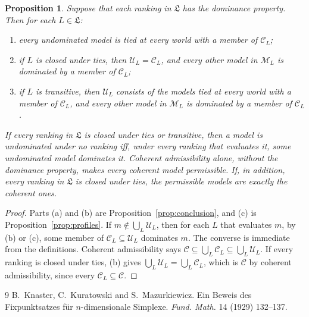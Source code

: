 \documentclass[11pt]{article}
\newtheorem{proposition}[theorem]{Proposition}
\theoremstyle{definition}
\newcommand{\M}{\mathcal M}
\newcommand{\C}{\mathcal C}
\newcommand{\U}{\mathcal U}
\newcommand{\Lf}{\mathfrak L}
\begin{document}
\begin{proposition}\label{prop:permissible}
Suppose that each ranking in $\Lf$ has the dominance property. Then for each $L\in\Lf$:
\begin{enumerate}[label=(\alph*)]
\item every undominated model is tied at every world with a member of $\C_L$;
\item if $L$ is closed under ties, then $\U_L=\C_L$, and every other model in $\M_L$ is dominated by a member of $\C_L$;
\item if $L$ is transitive, then $\U_L$ consists of the models tied at every world with a member of $\C_L$, and every other model in $\M_L$ is dominated by a member of $\C_L$.
\end{enumerate}
If every ranking in $\Lf$ is closed under ties or transitive, then a model is undominated under no ranking iff, under every ranking that evaluates it, some undominated model dominates it. Coherent admissibility alone, without the dominance property, makes every coherent model permissible. If, in addition, every ranking in $\Lf$ is closed under ties, the permissible models are exactly the coherent ones.
\end{proposition}
\begin{proof}
Parts (a) and (b) are Proposition~\ref{prop:conclusion}, and (c) is Proposition~\ref{prop:profiles}. If $m\notin\bigcup_L\U_L$, then for each $L$ that evaluates $m$, by (b) or (c), some member of $\C_L\subseteq\U_L$ dominates $m$. The converse is immediate from the definitions. Coherent admissibility says $\C\subseteq\bigcup_L\C_L\subseteq\bigcup_L\U_L$. If every ranking is closed under ties, (b) gives $\bigcup_L\U_L=\bigcup_L\C_L$, which is $\C$ by coherent admissibility, since every $\C_L\subseteq\C$.
\end{proof}

\begin{thebibliography}{9}
 B.~Knaster, C.~Kuratowski and S.~Mazurkiewicz. Ein Beweis des Fixpunktsatzes f\"ur $n$-dimensionale Simplexe. \emph{Fund. Math.} 14 (1929) 132--137.
\end{thebibliography}
\end{document}
